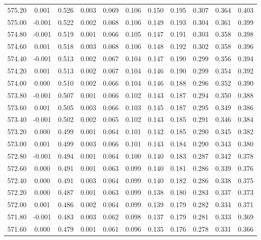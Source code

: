 \begin{longtable}{cccccccccc}
    575.20 &  0.001 &  0.526 &  0.003 &  0.069 &  0.106 &  0.150 &  0.195 &  0.307 &  0.364 &  0.403 \\
    575.00 & -0.001 &  0.522 &  0.002 &  0.068 &  0.106 &  0.149 &  0.193 &  0.304 &  0.361 &  0.399 \\
    574.80 & -0.001 &  0.519 &  0.001 &  0.066 &  0.105 &  0.147 &  0.191 &  0.303 &  0.358 &  0.398 \\
    574.60 &  0.001 &  0.518 &  0.003 &  0.068 &  0.106 &  0.148 &  0.192 &  0.302 &  0.358 &  0.396 \\
    574.40 & -0.001 &  0.513 &  0.002 &  0.067 &  0.104 &  0.147 &  0.190 &  0.299 &  0.356 &  0.394 \\
    574.20 &  0.001 &  0.513 &  0.002 &  0.067 &  0.104 &  0.146 &  0.190 &  0.299 &  0.354 &  0.392 \\
    574.00 &  0.000 &  0.510 &  0.002 &  0.066 &  0.104 &  0.146 &  0.188 &  0.296 &  0.352 &  0.390 \\
    573.80 & -0.001 &  0.507 &  0.001 &  0.066 &  0.102 &  0.143 &  0.187 &  0.294 &  0.350 &  0.388 \\
    573.60 &  0.001 &  0.505 &  0.003 &  0.066 &  0.103 &  0.145 &  0.187 &  0.295 &  0.349 &  0.386 \\
    573.40 & -0.001 &  0.502 &  0.002 &  0.065 &  0.102 &  0.143 &  0.185 &  0.291 &  0.346 &  0.384 \\
    573.20 &  0.000 &  0.499 &  0.001 &  0.064 &  0.101 &  0.142 &  0.185 &  0.290 &  0.345 &  0.382 \\
    573.00 &  0.001 &  0.499 &  0.003 &  0.066 &  0.101 &  0.143 &  0.184 &  0.290 &  0.343 &  0.380 \\
    572.80 & -0.001 &  0.494 &  0.001 &  0.064 &  0.100 &  0.140 &  0.183 &  0.287 &  0.342 &  0.378 \\
    572.60 &  0.000 &  0.491 &  0.001 &  0.063 &  0.099 &  0.140 &  0.181 &  0.286 &  0.339 &  0.376 \\
    572.40 &  0.000 &  0.491 &  0.003 &  0.064 &  0.099 &  0.140 &  0.182 &  0.286 &  0.338 &  0.375 \\
    572.20 &  0.000 &  0.487 &  0.001 &  0.063 &  0.099 &  0.138 &  0.180 &  0.283 &  0.337 &  0.373 \\
    572.00 &  0.001 &  0.486 &  0.002 &  0.064 &  0.099 &  0.139 &  0.179 &  0.282 &  0.334 &  0.371 \\
    571.80 & -0.001 &  0.483 &  0.003 &  0.062 &  0.098 &  0.137 &  0.179 &  0.281 &  0.333 &  0.369 \\
    571.60 &  0.000 &  0.479 &  0.001 &  0.061 &  0.096 &  0.135 &  0.176 &  0.278 &  0.331 &  0.366 \\

\end{longtable}
